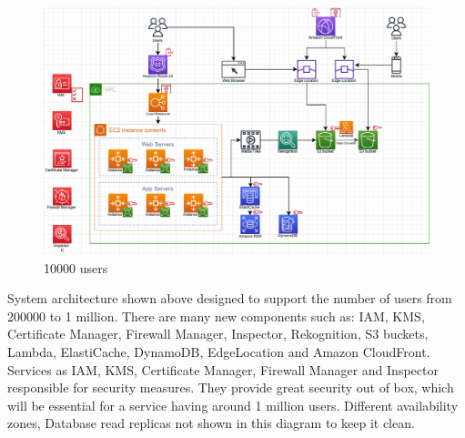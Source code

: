 \begin{figure}[h]
    \centering
    \includegraphics[scale=0.5]{figures/d4.pdf}
    \caption{10000 users}
    \label{fig:gp}
\end{figure}

System architecture shown above designed to support the number of users from 200000 to 1 million. There are many new components such as: IAM, KMS, Certificate Manager, Firewall Manager, Inspector, Rekognition, S3 buckets, Lambda, ElastiCache, DynamoDB, EdgeLocation and Amazon CloudFront. Services as IAM, KMS, Certificate Manager, Firewall Manager and Inspector responsible for security measures. They provide great security out of box, which will be essential for a service having around 1 million users. Different availability zones, Database read replicas not shown in this diagram to keep it clean. \\

